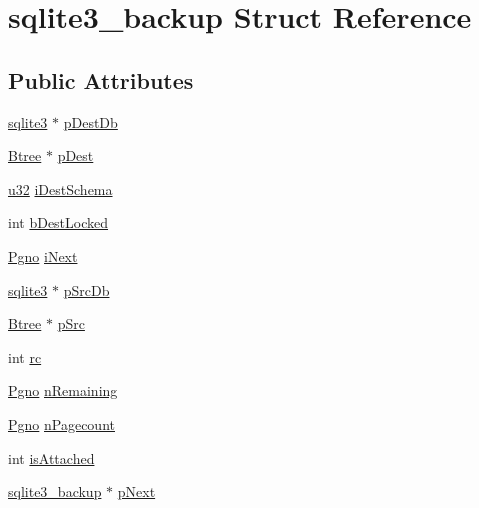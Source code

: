 \hypertarget{structsqlite3__backup}{\section{sqlite3\-\_\-backup Struct Reference}
\label{structsqlite3__backup}
}
\subsection*{Public Attributes}
\begin{DoxyCompactItemize}
\item 
\hyperlink{structsqlite3}{sqlite3} $\ast$ \hyperlink{structsqlite3__backup_ad9b5074a860e01b31bbf9cb27f3808d9}{p\-Dest\-Db}
\item 
\hyperlink{struct_btree}{Btree} $\ast$ \hyperlink{structsqlite3__backup_a9e011336a89274f0ebfefdcede198f71}{p\-Dest}
\item 
\hyperlink{sqlite3_8c_a03ad5adfaeb9b7640dde78a0cc390319}{u32} \hyperlink{structsqlite3__backup_a3f294f50b4ef206452dddd14f2a7cf6a}{i\-Dest\-Schema}
\item 
int \hyperlink{structsqlite3__backup_aa0d385678bc5c3fd4da4201ff03a5856}{b\-Dest\-Locked}
\item 
\hyperlink{sqlite3_8c_aec0c653e8dd16e4639caf2f8ea54f55c}{Pgno} \hyperlink{structsqlite3__backup_a92454bf354f928aade2b2f92e6cfd088}{i\-Next}
\item 
\hyperlink{structsqlite3}{sqlite3} $\ast$ \hyperlink{structsqlite3__backup_a0bcc0528bb3f5ec52eb40c3e7a4f7adc}{p\-Src\-Db}
\item 
\hyperlink{struct_btree}{Btree} $\ast$ \hyperlink{structsqlite3__backup_aa48f873d1de446638ff71fdae606e672}{p\-Src}
\item 
int \hyperlink{structsqlite3__backup_aab860dbed6181702b4c6b80d43cde411}{rc}
\item 
\hyperlink{sqlite3_8c_aec0c653e8dd16e4639caf2f8ea54f55c}{Pgno} \hyperlink{structsqlite3__backup_a4287faa23d4534e8a33915740604d1e1}{n\-Remaining}
\item 
\hyperlink{sqlite3_8c_aec0c653e8dd16e4639caf2f8ea54f55c}{Pgno} \hyperlink{structsqlite3__backup_a98599d5a3a13173a6a126242d1fbbaa8}{n\-Pagecount}
\item 
int \hyperlink{structsqlite3__backup_af515f0d9265847d820cbaad41cef78ae}{is\-Attached}
\item 
\hyperlink{structsqlite3__backup}{sqlite3\-\_\-backup} $\ast$ \hyperlink{structsqlite3__backup_a3a87332e045fe4a477fe262409c6011a}{p\-Next}
\end{DoxyCompactItemize}


